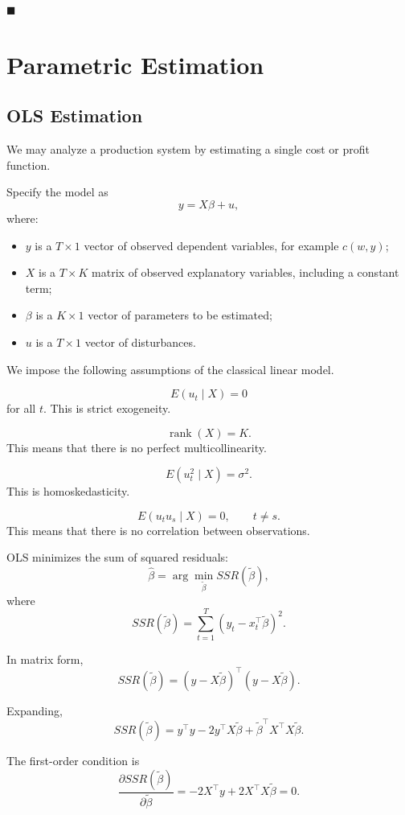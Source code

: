\hfill\(\blacksquare\)

\section{Parametric Estimation}

\subsection{OLS Estimation}

We may analyze a production system by estimating a single cost or profit function.

Specify the model as
\[
y=X\beta+u,
\]
where:

\begin{itemize}
    \item \(y\) is a \(T\times 1\) vector of observed dependent variables, for example \(c(w,y)\);
    \item \(X\) is a \(T\times K\) matrix of observed explanatory variables, including a constant term;
    \item \(\beta\) is a \(K\times 1\) vector of parameters to be estimated;
    \item \(u\) is a \(T\times 1\) vector of disturbances.
\end{itemize}

We impose the following assumptions of the classical linear model.

\[
E(u_t\mid X)=0
\]
for all \(t\). This is strict exogeneity.

\[
\operatorname{rank}(X)=K.
\]
This means that there is no perfect multicollinearity.

\[
E(u_t^2\mid X)=\sigma^2.
\]
This is homoskedasticity.

\[
E(u_tu_s\mid X)=0,
\qquad
t\ne s.
\]
This means that there is no correlation between observations.

OLS minimizes the sum of squared residuals:
\[
\hat\beta
=
\arg\min_{\tilde\beta}
SSR(\tilde\beta),
\]
where
\[
SSR(\tilde\beta)
=
\sum_{t=1}^T
(y_t-x_t^\top\tilde\beta)^2.
\]

In matrix form,
\[
SSR(\tilde\beta)
=
(y-X\tilde\beta)^\top
(y-X\tilde\beta).
\]

Expanding,
\[
SSR(\tilde\beta)
=
y^\top y
-
2y^\top X\tilde\beta
+
\tilde\beta^\top X^\top X\tilde\beta.
\]

The first-order condition is
\[
\frac{\partial SSR(\tilde\beta)}{\partial \tilde\beta}
=
-2X^\top y
+
2X^\top X\tilde\beta
=
0.
\]


